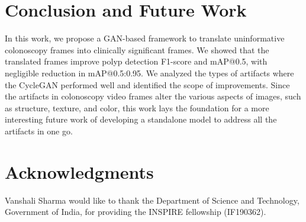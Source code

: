 \documentclass[letterpaper]{article} %
\begin{document}
\begin{table}

    \centering
    \large
   
    
     \caption{Comparative analysis of polyp detection results}
     \label{tab:localization}
\end{table}







\section{Conclusion and Future Work}
In this work, we propose a GAN-based framework to translate uninformative colonoscopy frames into clinically significant frames. We showed that the translated frames improve polyp detection F1-score and mAP@0.5, with negligible reduction in mAP@0.5:0.95. We analyzed the types of artifacts where the CycleGAN performed well and identified the scope of improvements. Since the artifacts in colonoscopy video frames alter the various aspects of images, such as structure, texture, and color, this work lays the foundation for a more interesting future work of developing a standalone model to address all the artifacts in one go.

\section{Acknowledgments}

Vanshali Sharma would like to thank the Department of Science and Technology, Government of India, for providing the INSPIRE fellowship (IF190362).


\fontsize{9.0pt}{10.0pt} \selectfont



\end{document}
